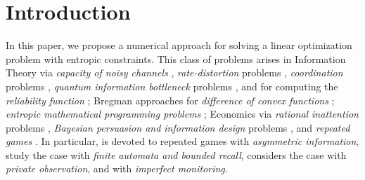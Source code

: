 \documentclass[smallextended,referee,envcountsect,]{svjour3}
\begin{document}






\section{Introduction}\label{sec:Introduction}
In this paper, we propose a numerical approach for solving a 
linear optimization problem with entropic constraints.
This class of problems arises in Information Theory via 
{\emph{capacity of noisy channels}
\cite{Arimoto72,Blahut72,ChiangBoyd_TIT2004,ElGhecheChierchiaPesquet_TIT2018,%
FaustFawziSaunderson_PMLR23,Hayashi_InfoGeometry2024,Hayashi_InfoGeometry25,%
HeSaundersonFawzi_TIT24,MatzDuhamel_ITW2004,NajaAlbergeDuhamel_ICASSP2010,shannon-bell-1948}},
\emph{rate-distortion} 
problems 
{\cite{Blahut72,ChiangBoyd_TIT2004,Csiszar74,ElGhecheChierchiaPesquet_TIT2018,%
Hayashi_TIT23,Hayashi_TIT25,He2024efficient,shannon-bell-1948,Shannon59}},
\emph{coordination} problems 
\cite{CuffPermuterCover10,Cuff(ImplicitCoordination)11,LeTreust(EmpiricalCoordination)17},
{\emph{quantum information bottleneck} problems 
\cite{Hayashi_Quantum2024}, and for computing the 
\emph{reliability function} 
\cite{BenTalTeboulleCharnes_JOTA88,CsiszarKorner(Book)11};
}
{Bregman approaches for \emph{difference of convex functions} 
\cite{FaustFawziSaunderson_PMLR23}; \emph{entropic mathematical 
programming problems} 
\cite{ChandrasekaranShah_MathProg2017,Erlander81};}
Economics via \emph{rational inattention} problems 
\cite{MackowiakMatejkaWiederholt2023,MatejkaMcKay2015,Sims03},
 \emph{Bayesian persuasion and information design} 
problems \cite{DovalSkreta2024,LeTreustTomala19},  and 
\textit{repeated games} 
\cite{GossnerHernandezNeyman06,GossnerLarakiTomala09,%
GossnerTomala06,GossnerTomala07,GossnerVieille02,%
NeymanOkada99,NeymanOkada00}. In particular, 
\cite{GossnerHernandezNeyman06} {is devoted} to repeated 
 games 
with \textit{asymmetric information},
 \cite{NeymanOkada99,NeymanOkada00} study the case with 
 \textit{finite automata 
and bounded recall}, \cite{GossnerVieille02} considers the case 
with \textit{private observation}, and  
\cite{GossnerLarakiTomala09,GossnerTomala06,GossnerTomala07}
with 
\textit{imperfect monitoring}.
\end{document}
